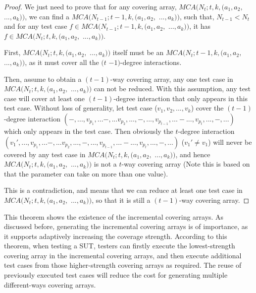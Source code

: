 \documentclass[conference]{IEEEtran}
\theoremstyle{definition}
\begin{document}
\begin{proof}
We just need to prove that for any covering array, $MCA(N_{t}; t, k, (a_{1},a_{2},$ $...,a_{k}))$, we can find a $MCA(N_{t-1}; t-1, k, (a_{1},a_{2},$ $...,a_{k}))$, such that, $N_{t-1} < N_{t}$ and for any test case  $f \in MCA(N_{t-1}; t-1, k, (a_{1},a_{2},$ $...,a_{k}))$, it has $f \in MCA(N_{t}; t, k, (a_{1},a_{2},$ $...,a_{k}))$.

 First, $MCA(N_{t}; t, k, (a_{1},a_{2},$ $...,a_{k}))$ itself must be an $MCA(N_{t}; t - 1, k, (a_{1},a_{2},$ $...,a_{k}))$, as it must cover all the $(t$ $ -1)$-degree interactions.

 Then, assume to obtain a $(t-1)$-way covering array, any one test case in $MCA(N_{t}; t, k, (a_{1},a_{2},$ $...,a_{k}))$ can not be reduced. With this assumption, any test case will cover at least one $(t-1)$-degree interaction that only appears in this test case. Without loss of generality,  let test case  ($v_{1}, v_{2}, ..., v_{k}$) cover the $(t-1)$-degree interaction $(-, ..., v_{p_{1}},...-,... v_{p_{2}},...,-, ..., v_{p_{t-1}},...-...,v_{p_{t}},...,-, ...)$ which only appears in the test case. Then obviously the $t$-degree interaction $(v_{1}', ..., v_{p_{1}},...-,... v_{p_{2}},...,-, ..., v_{p_{t-1}},...-...,v_{p_{t}},...,-, ...)$  ($v_{1}' \neq v_{1}$) will never be covered by any test case in $MCA(N_{t}; t, k, (a_{1},a_{2},$ $...,a_{k}))$, and hence $MCA(N_{t}; t, k, (a_{1},a_{2},$ $...,a_{k}))$ is not a $t$-way covering array (Note this is based on that the parameter can take on more than one value).

 This is a contradiction, and means that we can reduce at least one test case in $MCA(N_{t}; t, k, (a_{1},a_{2},$ $...,a_{k}))$, so that it is still a $(t-1)$-way covering array.
\end{proof}

This theorem shows the existence of the incremental covering arrays. As discussed before, generating the incremental covering arrays is of importance, as it supports adaptively increasing the coverage strength. According to this theorem, when testing a SUT, testers can firstly execute the lowest-strength covering array in the incremental covering arrays, and then execute additional test cases from those higher-strength covering arrays as required. The reuse of previously executed test cases will reduce the cost for generating multiple different-ways covering arrays.
\end{document}
